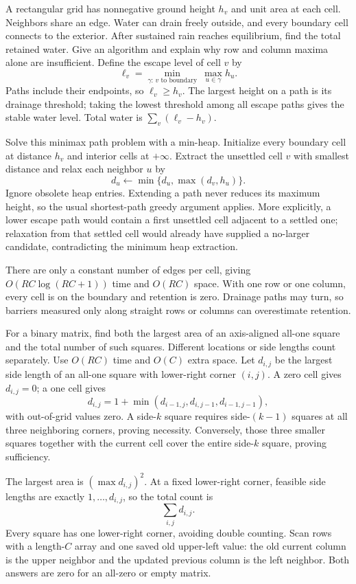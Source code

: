 A rectangular grid has nonnegative ground height $h_v$ and unit area at each cell. Neighbors share an edge. Water can drain freely outside, and every boundary cell connects to the exterior. After sustained rain reaches equilibrium, find the total retained water. Give an algorithm and explain why row and column maxima alone are insufficient.
\solution Define the escape level of cell $v$ by
\[
\ell_v=\min_{\gamma:\,v\text{ to boundary}}\ \max_{u\in\gamma}h_u.
\]
Paths include their endpoints, so $\ell_v\ge h_v$. The largest height on a path is its drainage threshold; taking the lowest threshold among all escape paths gives the stable water level. Total water is $\sum_v(\ell_v-h_v)$.

Solve this minimax path problem with a min-heap. Initialize every boundary cell at distance $h_v$ and interior cells at $+\infty$. Extract the unsettled cell $v$ with smallest distance and relax each neighbor $u$ by
\[
d_u\leftarrow\min\{d_u,\max(d_v,h_u)\}.
\]
Ignore obsolete heap entries. Extending a path never reduces its maximum height, so the usual shortest-path greedy argument applies. More explicitly, a lower escape path would contain a first unsettled cell adjacent to a settled one; relaxation from that settled cell would already have supplied a no-larger candidate, contradicting the minimum heap extraction.

There are only a constant number of edges per cell, giving $O(RC\log(RC+1))$ time and $O(RC)$ space. With one row or one column, every cell is on the boundary and retention is zero. Drainage paths may turn, so barriers measured only along straight rows or columns can overestimate retention.

For a binary matrix, find both the largest area of an axis-aligned all-one square and the total number of such squares. Different locations or side lengths count separately. Use $O(RC)$ time and $O(C)$ extra space.
\solution Let $d_{i,j}$ be the largest side length of an all-one square with lower-right corner $(i,j)$. A zero cell gives $d_{i,j}=0$; a one cell gives
\[
d_{i,j}=1+\min(d_{i-1,j},d_{i,j-1},d_{i-1,j-1}),
\]
with out-of-grid values zero. A side-$k$ square requires side-$(k-1)$ squares at all three neighboring corners, proving necessity. Conversely, those three smaller squares together with the current cell cover the entire side-$k$ square, proving sufficiency.

The largest area is $(\max d_{i,j})^2$. At a fixed lower-right corner, feasible side lengths are exactly $1,\ldots,d_{i,j}$, so the total count is
\[
\sum_{i,j}d_{i,j}.
\]
Every square has one lower-right corner, avoiding double counting. Scan rows with a length-$C$ array and one saved old upper-left value: the old current column is the upper neighbor and the updated previous column is the left neighbor. Both answers are zero for an all-zero or empty matrix.

